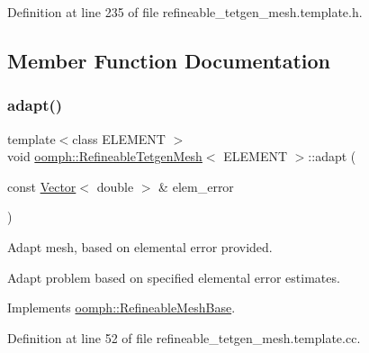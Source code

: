 Definition at line 235 of file refineable\+\_\+tetgen\+\_\+mesh.\+template.\+h.



\subsection{Member Function Documentation}
\mbox{\label{classoomph_1_1RefineableTetgenMesh_ad75ff5f1e088e611311c3f6a30feea5b}} 
\subsubsection{\texorpdfstring{adapt()}{adapt()}}
{\footnotesize\ttfamily template$<$class E\+L\+E\+M\+E\+NT $>$ \\
void \hyperlink{classoomph_1_1RefineableTetgenMesh}{oomph\+::\+Refineable\+Tetgen\+Mesh}$<$ E\+L\+E\+M\+E\+NT $>$\+::adapt (\begin{DoxyParamCaption}\item[{const \hyperlink{classoomph_1_1Vector}{Vector}$<$ double $>$ \&}]{elem\+\_\+error }\end{DoxyParamCaption})\hspace{0.3cm}{\ttfamily [virtual]}}



Adapt mesh, based on elemental error provided. 

Adapt problem based on specified elemental error estimates. 

Implements \hyperlink{classoomph_1_1RefineableMeshBase_aabe38fc56f2f12e91f2a2e8a4cf663b0}{oomph\+::\+Refineable\+Mesh\+Base}.



Definition at line 52 of file refineable\+\_\+tetgen\+\_\+mesh.\+template.\+cc.



